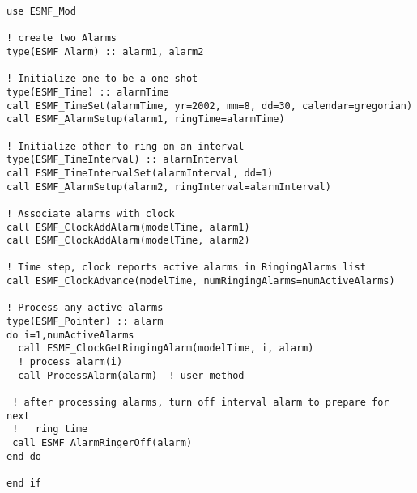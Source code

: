 
\begin{verbatim}
use ESMF_Mod

! create two Alarms
type(ESMF_Alarm) :: alarm1, alarm2

! Initialize one to be a one-shot
type(ESMF_Time) :: alarmTime
call ESMF_TimeSet(alarmTime, yr=2002, mm=8, dd=30, calendar=gregorian)
call ESMF_AlarmSetup(alarm1, ringTime=alarmTime)

! Initialize other to ring on an interval
type(ESMF_TimeInterval) :: alarmInterval
call ESMF_TimeIntervalSet(alarmInterval, dd=1)
call ESMF_AlarmSetup(alarm2, ringInterval=alarmInterval)

! Associate alarms with clock
call ESMF_ClockAddAlarm(modelTime, alarm1)
call ESMF_ClockAddAlarm(modelTime, alarm2)

! Time step, clock reports active alarms in RingingAlarms list
call ESMF_ClockAdvance(modelTime, numRingingAlarms=numActiveAlarms)

! Process any active alarms
type(ESMF_Pointer) :: alarm
do i=1,numActiveAlarms
  call ESMF_ClockGetRingingAlarm(modelTime, i, alarm)
  ! process alarm(i)
  call ProcessAlarm(alarm)  ! user method

 ! after processing alarms, turn off interval alarm to prepare for next
 !   ring time
 call ESMF_AlarmRingerOff(alarm)
end do

end if
\end{verbatim}
